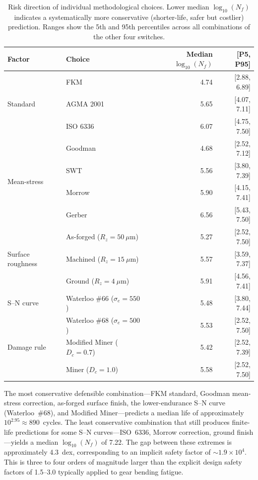 \documentclass[12pt,a4paper]{article}
\begin{document}
\begin{table}[h]
\centering
\caption{Risk direction of individual methodological choices. Lower
median $\log_{10}(N_f)$ indicates a systematically more conservative
(shorter-life, safer but costlier) prediction. Ranges show the 5th
and 95th percentiles across all combinations of the other four
switches.\label{tab:risk}}
\begin{tabular}{llrr}
\toprule
Factor & Choice & Median $\log_{10}(N_f)$ & [P5, P95] \\
\midrule
\multirow{3}{*}{Standard}
  & FKM & 4.74 & [2.88, 6.89] \\
  & AGMA 2001 & 5.65 & [4.07, 7.11] \\
  & ISO 6336 & 6.07 & [4.75, 7.50] \\
\midrule
\multirow{4}{*}{Mean-stress}
  & Goodman & 4.68 & [2.52, 7.12] \\
  & SWT & 5.56 & [3.80, 7.39] \\
  & Morrow & 5.90 & [4.15, 7.41] \\
  & Gerber & 6.56 & [5.43, 7.50] \\
\midrule
\multirow{3}{*}{Surface roughness}
  & As-forged ($R_z=50~\mu$m) & 5.27 & [2.52, 7.50] \\
  & Machined ($R_z=15~\mu$m) & 5.57 & [3.59, 7.37] \\
  & Ground ($R_z=4~\mu$m) & 5.91 & [4.56, 7.41] \\
\midrule
S--N curve
  & Waterloo \#66 ($\sigma_e=550$) & 5.48 & [3.80, 7.44] \\
  & Waterloo \#68 ($\sigma_e=500$) & 5.53 & [2.52, 7.50] \\
\midrule
Damage rule
  & Modified Miner ($D_c=0.7$) & 5.42 & [2.52, 7.39] \\
  & Miner ($D_c=1.0$) & 5.58 & [2.52, 7.50] \\
\bottomrule
\end{tabular}
\end{table}

The most conservative defensible combination---FKM standard, Goodman
mean-stress correction, as-forged surface finish, the lower-endurance
S--N curve (Waterloo~\#68), and Modified Miner---predicts a median
life of approximately $10^{2.95} \approx 890$~cycles. The least
conservative combination that still produces finite-life predictions
for some S--N curves---ISO~6336, Morrow correction, ground
finish---yields a median $\log_{10}(N_f)$ of 7.22. The gap between
these extremes is approximately 4.3~dex, corresponding to an implicit
safety factor of $\sim$$1.9 \times 10^4$. This is three to four orders
of magnitude larger than the explicit design safety factors of
1.5--3.0 typically applied to gear bending fatigue.
\end{document}
